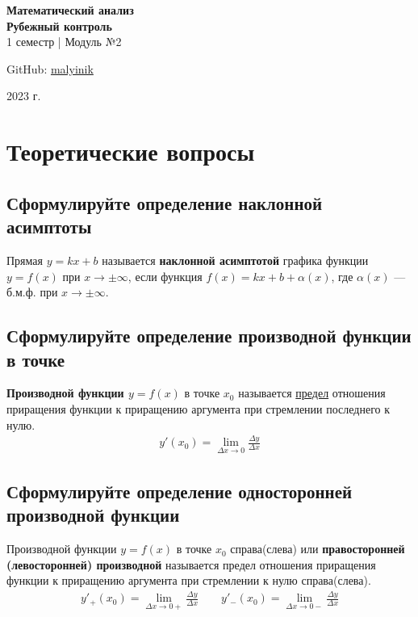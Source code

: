 



\begin{titlepage}
    \vspace*{0pt}
    \vfill
    \centering
    \Huge\textbf{Математический анализ} \\[7pt]
    \Large\textbf{Рубежный контроль} \\
    \large 1 семестр | Модуль №2 \\ 
    \vfill
    \begin{flushright}
        \normalsize GitHub: \href{https://github.com/malyinik}{malyinik} \\
    \end{flushright}
    \normalsize 2023 г.
\end{titlepage}
\newpage

\tableofcontents
\newpage
\section{Теоретические вопросы}
\subsection{Сформулируйте определение наклонной асимптоты}
\begin{definition}
	Прямая $y=kx+b$ называется \textbf{наклонной асимптотой} графика функции $y=f(x)$ при $x \to \pm \infty$, если функция $f(x) = kx+b + \alpha(x)$, где $\alpha(x)$ --- б.м.ф. при $x\to \pm \infty$.
\end{definition}

\subsection{Сформулируйте определение производной функции в точке}
\begin{definition}
	\textbf{Производной функции $y = f(x)$} в точке $x_0$ называется \underline{предел} отношения приращения функции к приращению аргумента при стремлении последнего к нулю.
	\begin{align*}
		\boxed{y'(x_0) = \lim\limits_{\Delta x \to 0} \frac{\Delta y}{\Delta x}}
	\end{align*}
\end{definition}

\subsection{Сформулируйте определение односторонней производной функции}
\begin{definition}
	Производной функции $y=f(x)$ в точке $x_0$ справа(слева) или \textbf{правосторонней (левосторонней) производной} называется предел отношения приращения функции к приращению аргумента при стремлении к нулю справа(слева).
	\begin{gather*}
		\boxed{y'_+(x_0) = \lim\limits_{\Delta x \to 0+} \frac{\Delta y}{\Delta x}} \qquad \boxed{y'_-(x_0) = \lim\limits_{\Delta x \to 0-} \frac{\Delta y}{\Delta x}}
	\end{gather*}
\end{definition}

